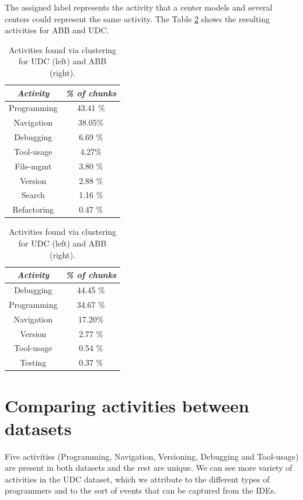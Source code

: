 The assigned label represents the activity that a center models and several centers could represent the same activity. The Table \ref{tbl:activities} shows the resulting activities for ABB and UDC.

\begin{table}
	\caption{Activities found via clustering for UDC (left) and ABB (right).}
	\label{tbl:activities}
	\centering
	\begin{tabular}{c | c }
		\hline 
		\emph{Activity} & \emph{\% of chunks}\\  
		\hline 
		\hline
		Programming & 43.41 \% \\
		\hline
		Navigation & 38.05\%\\
		\hline
		Debugging & 6.69 \% \\
		\hline	
		Tool-usage & 4.27\% \\
		\hline
		File-mgmt & 3.80 \% \\
		\hline 		
		Version & 2.88 \%\\
		\hline
		Search & 1.16 \% \\
		\hline
		Refactoring & 0.47 \% \\
		\hline
		
	\end{tabular}
	\quad
	\begin{tabular}{c | c }
		\hline 
		\emph{Activity} & \emph{\% of chunks}\\  
		\hline 
		\hline 
		Debugging & 44.45 \% \\
		\hline
		Programming & 34.67 \% \\
		\hline
		Navigation & 17.20\%\\
		\hline
		Version & 2.77 \%\\
		\hline
		Tool-usage & 0.54 \% \\
		\hline
		Testing & 0.37	 \% \\
		\hline
	\end{tabular}
\end{table}

\section{Comparing activities between datasets}

Five activities (Programming, Navigation, Versioning, Debugging and Tool-usage) are present in both datasets and the rest are unique. We can see more variety of activities in the UDC dataset, which we attribute to the different types of programmers and to the sort of events that can be captured from the IDEs.

